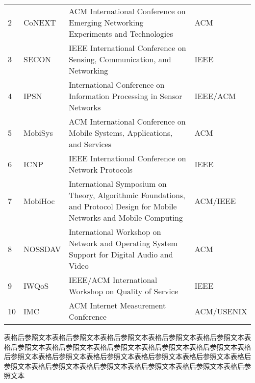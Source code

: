 \documentclass[doctor, vlined]{DissertUESTC}
\begin{document}
\begin{longtable}{p{2em} p{4.5em} p{20em} p{6em}}
		2 & CoNEXT & ACM International Conference on Emerging Networking Experiments and Technologies & ACM \\
		3 & SECON & IEEE International Conference on Sensing, Communication, and Networking & IEEE \\
		4 & IPSN & International Conference on Information Processing in Sensor Networks & IEEE/ACM \\
		5 & MobiSys & ACM International Conference on Mobile Systems, Applications, and Services & ACM \\
		6 & ICNP & IEEE International Conference on Network Protocols & IEEE\tablenoteref{tn: 手动跨页表格附注标签IEEE} \\
		7 & MobiHoc & International Symposium on Theory, Algorithmic Foundations, and Protocol Design for Mobile Networks and Mobile Computing & ACM/IEEE \\
		8 & NOSSDAV & International Workshop on Network and Operating System Support for Digital Audio and Video & ACM\tablenoteref{tn: 手动跨页表格附注标签ACM} \\
		9 & IWQoS & IEEE/ACM International Workshop on Quality of Service & IEEE \\
		10 & IMC & ACM Internet Measurement Conference & ACM/USENIX \\
		
		
	\end{longtable}

	表格后参照文本表格后参照文本表格后参照文本表格后参照文本表格后参照文本表格后参照文本表格后参照文本表格后参照文本表格后参照文本表格后参照文本表格后参照文本表格后参照文本表格后参照文本表格后参照文本表格后参照文本表格后参照文本表格后参照文本表格后参照文本表格后参照文本表格后参照文本表格后参照文本

	\newpage
\end{document}
